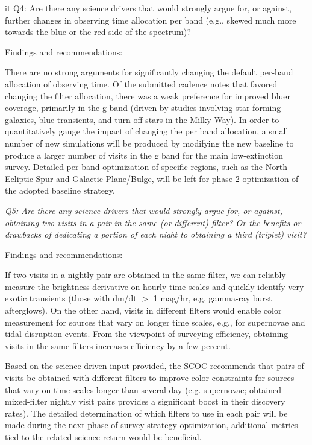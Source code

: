 {it Q4:  Are there any science drivers that would strongly argue for, or against, further changes in observing time allocation per band (e.g., skewed much more towards the blue or the red side of the spectrum)? }

Findings and recommendations:

There are no strong arguments for significantly changing the default per-band allocation of observing time. Of the submitted cadence notes that favored changing the filter allocation, there was a weak preference for improved bluer coverage, primarily in the g band (driven by studies involving star-forming galaxies, blue transients, and turn-off stars in the Milky Way). In order to quantitatively gauge the impact of changing the per band allocation, a small number of new simulations will be produced by modifying the new baseline to produce a larger number of visits in the g band for the main low-extinction survey. Detailed per-band optimization of specific regions, such as the North Ecliptic Spur and Galactic Plane/Bulge, will be left for phase 2 optimization of the adopted baseline strategy. 


{\it Q5:  Are there any science drivers that would strongly argue for, or against, obtaining two visits in a pair in the same (or different) filter? Or the benefits or drawbacks of dedicating  a portion of each night to obtaining a third (triplet) visit?   }

Findings and recommendations:

If two visits in a nightly pair are obtained in the same filter, we can reliably measure the brightness derivative on hourly time scales and quickly identify very exotic transients (those with dm/dt $>$ 1 mag/hr, e.g. gamma-ray burst afterglows). On the other hand, visits in different filters would enable color measurement for sources that vary on longer time scales, e.g., for supernovae and tidal disruption events. From the viewpoint of surveying efficiency, obtaining visits in the same filters increases efficiency by a few percent.

Based on the science-driven input provided, the SCOC recommends that pairs of visits be obtained with different filters to improve color constraints for sources that vary on time scales longer than several day (e.g. supernovae;  obtained mixed-filter nightly visit pairs provides a significant boost in their discovery rates). The detailed determination of which filters to use in each pair will be made during the next phase of survey strategy optimization, additional metrics tied to the related science return would be beneficial.  

